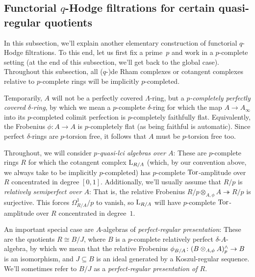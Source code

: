 \documentclass[DIV=12,numbers=enddot,leqno,bibliography=totoc]{scrartcl}
\begin{document}
	
	\subsection{Functorial \texorpdfstring{$q$}{q}-Hodge filtrations for certain quasi-regular quotients}\label{subsec:CanonicalqHodgeQuasiregular}
	
	In this subsection, we'll explain another elementary construction of functorial $q$-Hodge filtrations. To this end, let us first fix a prime~$p$ and work in a $p$-complete setting (at the end of this subsection, we'll get back to the global case). Throughout this subsection, all ($q$-)de Rham complexes or cotangent complexes relative to $p$-complete rings will be implicitly $p$-completed.
	
	\begin{numpar}\label{par:RingsOfInterest}
		Temporarily, $A$ will not be a perfectly covered $\Lambda$-ring, but a \emph{$p$-completely perfectly covered $\delta$-ring}, by which we mean a $p$-complete $\delta$-ring for which the map $A\rightarrow A_\infty$ into its $p$-completed colimit perfection is $p$-completely faithfully flat. Equivalently, the Frobenius $\phi\colon A\rightarrow A$ is $p$-completely flat (as being faithful is automatic). Since perfect $\delta$-rings are $p$-torsion free, it follows that $A$ must be $p$-torsion free too.
		
		Throughout, we will consider \emph{$p$-quasi-lci algebras over $A$}: These are $p$-complete rings $R$ for which the cotangent complex $\mathrm{L}_{R/A}$ (which, by our convention above, we always take to be implicitly $p$-completed) has $p$-complete $\operatorname{Tor}$-amplitude over $R$ concentrated in degree $[0,1]$. Additionally, we'll usually assume that $R/p$ is \emph{relatively semiperfect over $A$}: That is, the relative Frobenius $R/p\otimes_{A,\phi}A\twoheadrightarrow R/p$ is surjective. This forces $\Omega_{R/A}^1/p$ to vanish, so $\mathrm{L}_{R/A}$ will have $p$-complete $\operatorname{Tor}$-amplitude over $R$ concentrated in degree~$1$.
		
		An important special case are $A$-algebras of \emph{perfect-regular presentation}: These are the quotients $R\cong B/J$, where $B$ is a $p$-complete relatively perfect $\delta$-$A$-algebra, by which we mean that the relative Frobenius $\phi_{B/A}\colon (B\otimes_{A,\phi}A)_p^\complete\rightarrow B$ is an isomorphism, and $J\subseteq B$ is an ideal generated by a Koszul-regular sequence. We'll sometimes refer to $B/J$ as a \emph{perfect-regular presentation of $R$}.
	\end{numpar}
\end{document}
